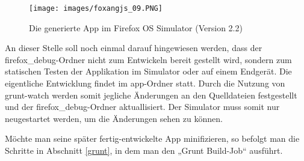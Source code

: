 \begin{figure}[!ht]
  \centering
    \texttt{[image: images/foxangjs\_09.PNG]}\\
  \caption{Die generierte App im Firefox OS Simulator (Version 2.2)}
  \label{fig:foxangjs9}
\end{figure}

An dieser Stelle soll noch einmal darauf hingewiesen werden, dass der firefox\_debug-Ordner nicht zum Entwickeln bereit gestellt wird, sondern zum statischen Testen der Applikation im Simulator oder auf einem Endgerät.
Die eigentliche Entwicklung findet im app-Ordner statt.
Durch die Nutzung von grunt-watch werden somit jegliche Änderungen an den Quelldateien festgestellt und der firefox\_debug-Ordner aktuallisiert.
Der Simulator muss somit nur neugestartet werden, um die Änderungen sehen zu können.

Möchte man seine später fertig-entwickelte App minifizieren, so befolgt man die Schritte in Abschnitt \ref{grunt}, in dem man den „Grunt Build-Job“ ausführt.

\clearpage